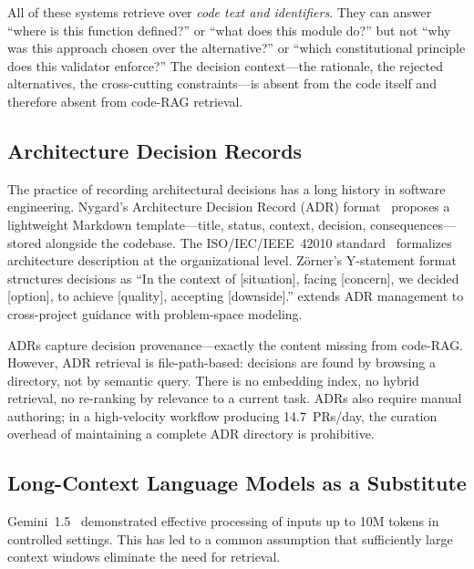 \documentclass[11pt]{article}
\begin{document}
All of these systems retrieve over \emph{code text and identifiers}.
They can answer ``where is this function defined?'' or ``what does this module do?'' but not ``why was this approach chosen over the alternative?'' or ``which constitutional principle does this validator enforce?''
The decision context---the rationale, the rejected alternatives, the cross-cutting constraints---is absent from the code itself and therefore absent from code-RAG retrieval.

\subsection{Architecture Decision Records}
\label{sec:related-adr}

The practice of recording architectural decisions has a long history in software engineering.
Nygard's Architecture Decision Record (ADR) format~\citep{nygard2011adr} proposes a lightweight Markdown template---title, status, context, decision, consequences---stored alongside the codebase.
The ISO/IEC/IEEE~42010 standard~\citep{iso42010} formalizes architecture description at the organizational level.
Z\"orner's Y-statement format~\citep{zorner2015softwarearchitekturen} structures decisions as ``In the context of [situation], facing [concern], we decided [option], to achieve [quality], accepting [downside].''
\citet{zimmermann2015architectural} extends ADR management to cross-project guidance with problem-space modeling.

ADRs capture decision provenance---exactly the content missing from code-RAG.
However, ADR retrieval is file-path-based: decisions are found by browsing a directory, not by semantic query.
There is no embedding index, no hybrid retrieval, no re-ranking by relevance to a current task.
ADRs also require manual authoring; in a high-velocity workflow producing 14.7~PRs/day, the curation overhead of maintaining a complete ADR directory is prohibitive.

\subsection{Long-Context Language Models as a Substitute}
\label{sec:related-longcontext}

Gemini~1.5~\citep{reid2024gemini} demonstrated effective processing of inputs up to 10M tokens in controlled settings.
This has led to a common assumption that sufficiently large context windows eliminate the need for retrieval.
\end{document}

